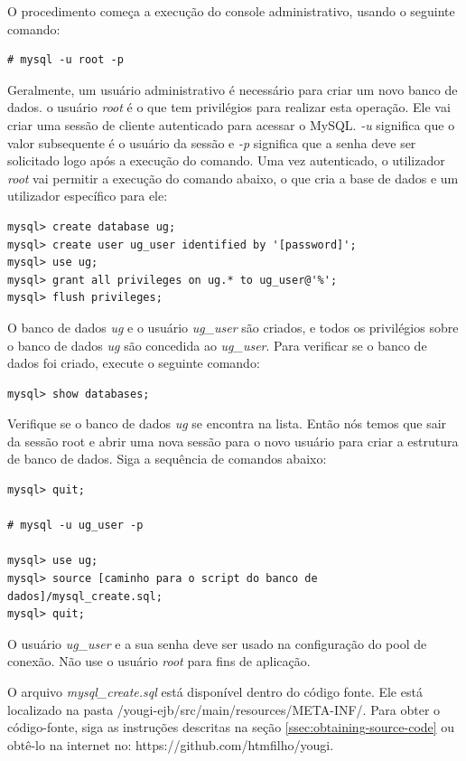 \documentclass[envcountsame,envcountchap,letterpaper]{svmono}
\begin{document}
O procedimento começa a execução do console administrativo, usando o seguinte comando:

\begin{verbatim}
# mysql -u root -p
\end{verbatim}

Geralmente, um usuário administrativo é necessário para criar um novo banco de dados. o usuário \textit{root} é o que tem privilégios para realizar esta operação. Ele vai criar uma sessão de cliente autenticado para acessar o MySQL. \textit{-u} significa que o valor subsequente é o usuário da sessão e \textit{-p} significa que a senha deve ser solicitado logo após a execução do comando. Uma vez autenticado, o utilizador \textit{root} vai permitir a execução do comando abaixo, o que cria a base de dados e um utilizador específico para ele:

\begin{verbatim}
mysql> create database ug;
mysql> create user ug_user identified by '[password]';
mysql> use ug;
mysql> grant all privileges on ug.* to ug_user@'%';
mysql> flush privileges;
\end{verbatim}

O banco de dados \textit{ug} e o usuário \textit{ug\_user} são criados, e todos os privilégios sobre o banco de dados \textit{ug} são concedida ao \textit{ug\_user}. Para verificar se o banco de dados foi criado, execute o seguinte comando:

\begin{verbatim}
mysql> show databases;
\end{verbatim}

Verifique se o banco de dados \textit{ug} se encontra na lista. Então nós temos que sair da sessão root e abrir uma nova sessão para o novo usuário para criar a estrutura de banco de dados. Siga a sequência de comandos abaixo:

\begin{verbatim}
mysql> quit;

# mysql -u ug_user -p

mysql> use ug;
mysql> source [caminho para o script do banco de dados]/mysql_create.sql;
mysql> quit;
\end{verbatim}

O usuário \textit{ug\_user} e a sua senha deve ser usado na configuração do pool de conexão. Não use o usuário \textit{root} para fins de aplicação.

O arquivo \textit{mysql\_create.sql} está disponível dentro do código fonte. Ele está localizado na pasta /yougi-ejb/src/main/resources/META-INF/. Para obter o código-fonte, siga as instruções descritas na seção \ref{ssec:obtaining-source-code} ou obtê-lo na internet no: https://github.com/htmfilho/yougi.
\end{document}
